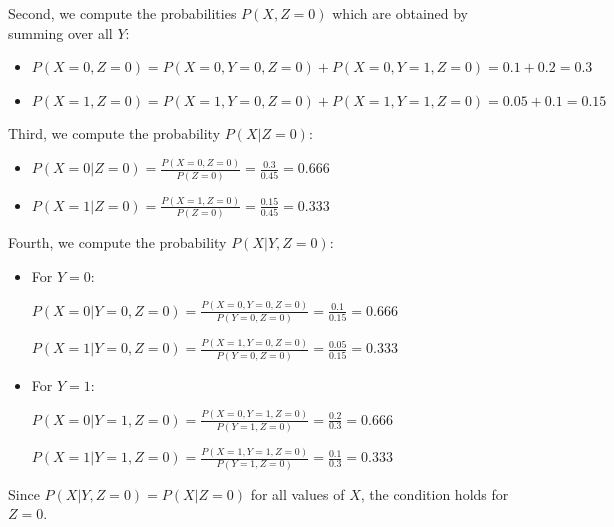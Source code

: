 \documentclass[12pt,letterpaper, onecolumn]{exam}
\begin{document}
\begin{questions}
\begin{parts}
\begin{subparts}
\begin{solution}
                Second, we compute the probabilities $P(X, Z=0)$ which are obtained by summing over all $Y$:

                \begin{itemize}
                    \item $P(X=0, Z=0) = P(X=0, Y=0, Z=0) + P(X=0, Y=1, Z=0) = 0.1 + 0.2 = 0.3$
                    \item $P(X=1, Z=0) = P(X=1, Y=0, Z=0) + P(X=1, Y=1, Z=0) = 0.05 + 0.1 = 0.15$
                \end{itemize}

                Third, we compute the probability $P(X|Z=0)$:

                \begin{itemize}
                    \item $\displaystyle{P(X=0|Z=0) = \frac{P(X=0, Z=0)}{P(Z=0)} = \frac{0.3}{0.45} = 0.666}$
                    \item $\displaystyle{P(X=1|Z=0) = \frac{P(X=1, Z=0)}{P(Z=0)} = \frac{0.15}{0.45} = 0.333}$
                \end{itemize}

                Fourth, we compute the probability $P(X|Y, Z=0)$:

                \begin{itemize}
                    \item For $Y=0$:
                    \begin{center}
                    $\displaystyle{P(X=0|Y=0, Z=0) = \frac{P(X=0, Y=0, Z=0)}{P(Y=0, Z=0)} = \frac{0.1}{0.15} = 0.666}$

                    $\displaystyle{P(X=1|Y=0, Z=0) = \frac{P(X=1, Y=0, Z=0)}{P(Y=0, Z=0)} = \frac{0.05}{0.15} = 0.333}$
                    \end{center}

                    \item For $Y=1$:
                    \begin{center}
                    $\displaystyle{P(X=0|Y=1, Z=0) = \frac{P(X=0, Y=1, Z=0)}{P(Y=1, Z=0)} = \frac{0.2}{0.3} = 0.666}$

                    $\displaystyle{P(X=1|Y=1, Z=0) = \frac{P(X=1, Y=1, Z=0)}{P(Y=1, Z=0)} = \frac{0.1}{0.3} = 0.333}$
                    \end{center}
                \end{itemize}

                Since $P(X|Y, Z=0) = P(X|Z=0)$ for all values of $X$, the condition holds for $Z=0$.


\end{solution}
\end{subparts}
\end{parts}
\end{questions}
\end{document}
